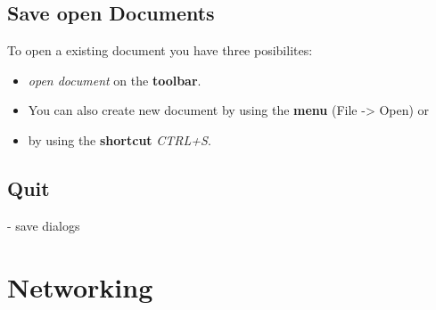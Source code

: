 \documentclass[11pt,a4paper]{article}
\begin{document}
\subsection{Save open Documents}

To open a existing document you have three posibilites:
\begin{itemize}
\item \textit{open document} on the \textbf{toolbar}.
\item You can also create new document by using the \textbf{menu} (File -> Open) or
\item by using the \textbf{shortcut} \textit{CTRL+S}.
\end{itemize}

\subsection{Quit}
- save dialogs




\newpage
\section{Networking}

\end{document}
